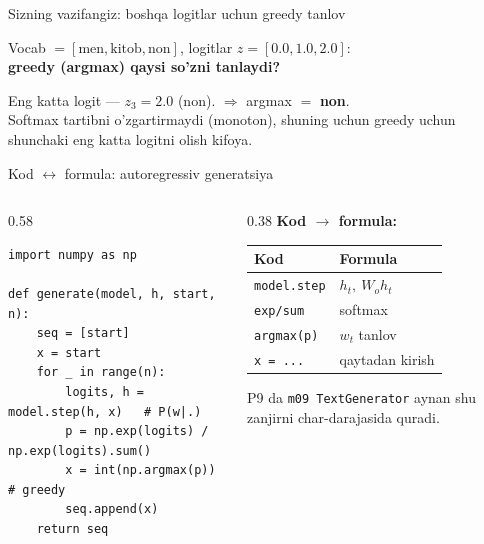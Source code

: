 \documentclass[aspectratio=169,11pt]{beamer}
\begin{document}
\begin{frame}{Sizning vazifangiz: boshqa logitlar uchun greedy tanlov}
  \begin{tcolorbox}[warnbox,title=Savol --- 60 soniya]
    \small
    Vocab $=[\text{men}, \text{kitob}, \text{non}]$, logitlar $z=[0.0, 1.0, 2.0]$:\\[4pt]
    \textbf{\large greedy (argmax) qaysi so'zni tanlaydi?}
  \end{tcolorbox}
  \pause
  \begin{tcolorbox}[okbox,title=Javob]
    \small
    Eng katta logit --- $z_3=2.0$ ($\text{non}$). $\Rightarrow$ argmax $=$ \textbf{non}.\\[3pt]
    \footnotesize Softmax tartibni o'zgartirmaydi (monoton), shuning uchun greedy uchun
    shunchaki eng katta logitni olish kifoya.
  \end{tcolorbox}
\end{frame}

\begin{frame}[fragile]{Kod $\leftrightarrow$ formula: autoregressiv generatsiya}
  \begin{columns}[T]
    \begin{column}{0.58\textwidth}
\begin{lstlisting}
import numpy as np

def generate(model, h, start, n):
    seq = [start]
    x = start
    for _ in range(n):
        logits, h = model.step(h, x)   # P(w|.)
        p = np.exp(logits) / np.exp(logits).sum()
        x = int(np.argmax(p))          # greedy
        seq.append(x)
    return seq
\end{lstlisting}
    \end{column}
    \begin{column}{0.38\textwidth}
      \textbf{Kod $\to$ formula:}\\[3pt]
      \footnotesize
      \begin{tabular}{p{1.7cm}p{1.9cm}}
        \toprule
        Kod & Formula \\
        \midrule
        \texttt{model.step} & $h_t,\ W_o h_t$ \\
        \texttt{exp/sum} & softmax \\
        \texttt{argmax(p)} & $w_t$ tanlov \\
        \texttt{x = ...} & qaytadan kirish \\
        \bottomrule
      \end{tabular}
      \vspace{4pt}
      \begin{tcolorbox}[okbox,top=2pt,bottom=2pt]
        \footnotesize
        P9 da \texttt{m09 TextGenerator} aynan shu zanjirni char-darajasida quradi.
      \end{tcolorbox}
    \end{column}
  \end{columns}
\end{frame}
\end{document}
